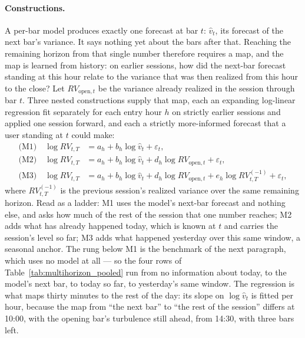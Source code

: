 \paragraph{Constructions.} A per-bar model produces exactly one
forecast at bar $t$: $\hat v_t$, its forecast of the next bar's
variance. It says nothing yet about the bars after that. Reaching the
remaining horizon from that single number therefore requires a map, and
the map is learned from history: on earlier sessions, how did the
next-bar forecast standing at this hour relate to the variance that was
then realized from this hour to the close? Let $RV_{\mathrm{open},t}$
be the variance already realized in the session through bar $t$. Three
nested constructions supply that map, each an expanding log-linear
regression fit separately for each entry hour $h$ on strictly earlier
sessions and applied one session forward, and each a strictly
more-informed forecast that a user standing at $t$ could make:
\begin{align}
    \text{(M1)}\quad
    \log RV_{t,T} &= a_h + b_h \log \hat v_t + \varepsilon_t,
    \label{eq:mh_m1} \\
    \text{(M2)}\quad
    \log RV_{t,T} &= a_h + b_h \log \hat v_t
                   + d_h \log RV_{\mathrm{open},t} + \varepsilon_t,
    \label{eq:mh_m2} \\
    \text{(M3)}\quad
    \log RV_{t,T} &= a_h + b_h \log \hat v_t
                   + d_h \log RV_{\mathrm{open},t}
                   + e_h \log RV^{(-1)}_{t,T} + \varepsilon_t,
    \label{eq:mh_m3}
\end{align}
where $RV^{(-1)}_{t,T}$ is the previous session's realized variance
over the same remaining horizon. Read as a ladder: M1 uses the model's
next-bar forecast and nothing else, and asks how much of the rest of
the session that one number reaches; M2 adds what has already happened
today, which is known at $t$ and carries the session's level so far;
M3 adds what happened yesterday over this same window, a seasonal
anchor. The rung below M1 is the benchmark of the next paragraph, which
uses no model at all --- so the four rows of
Table~\ref{tab:multihorizon_pooled} run from no information about
today, to the model's next bar, to today so far, to yesterday's same
window. The regression is what maps thirty minutes
to the rest of the day: its slope on $\log \hat v_t$ is fitted per
hour, because the map from ``the next bar'' to ``the rest of the
session'' differs at 10:00, with the opening bar's turbulence still
ahead, from 14:30, with three bars left.
